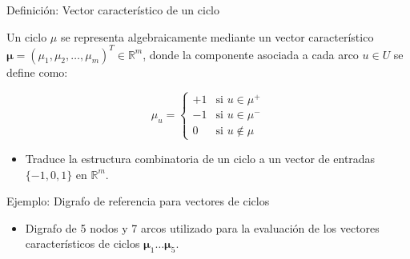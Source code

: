 \documentclass[
  ignorenonframetext,
]{beamer}
\providecommand{\tightlist}{%
  \setlength{\itemsep}{0pt}\setlength{\parskip}{0pt}}
\begin{document}
\begin{frame}{Definición: Vector característico de un ciclo}
\label{definiciuxf3n-vector-caracteruxedstico-de-un-ciclo}
\begin{tcolorbox}[enhanced jigsaw, opacityback=0, breakable, title=\textcolor{quarto-callout-note-color}{\faInfo}\hspace{0.5em}{Vector característico de un ciclo}, colback=white, colbacktitle=quarto-callout-note-color!10!white, bottomrule=.15mm, opacitybacktitle=0.6, coltitle=black, bottomtitle=1mm, leftrule=.75mm, colframe=quarto-callout-note-color-frame, toptitle=1mm, titlerule=0mm, rightrule=.15mm, left=2mm, arc=.35mm, toprule=.15mm]

Un ciclo \(\mu\) se representa algebraicamente mediante un vector
característico
\(\mathbf{\mu} = (\mu_1, \mu_2, \dots, \mu_m)^T \in \mathbb{R}^m\),
donde la componente asociada a cada arco \(u \in U\) se define como:

\[
\mu_u = \begin{cases}
+1 & \text{si } u \in \mu^+ \\
-1 & \text{si } u \in \mu^- \\
0 & \text{si } u \notin \mu
\end{cases}
\]

\end{tcolorbox}

\begin{itemize}
\tightlist
\item
  Traduce la estructura combinatoria de un ciclo a un vector de entradas
  \(\{-1, 0, 1\}\) en \(\mathbb{R}^m\).
\end{itemize}
\end{frame}

\begin{frame}{Ejemplo: Digrafo de referencia para vectores de ciclos}
\label{ejemplo-digrafo-de-referencia-para-vectores-de-ciclos}
\begin{itemize}
\tightlist
\item
  Digrafo de 5 nodos y 7 arcos utilizado para la evaluación de los
  vectores característicos de ciclos
  \(\mathbf{\mu}_1 \dots \mathbf{\mu}_5\).
\end{itemize}
\end{frame}
\end{document}
